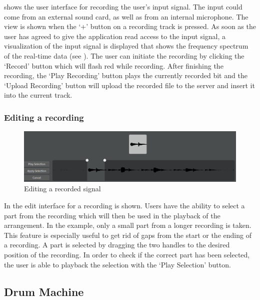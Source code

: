  shows the user interface for recording the user's input signal. The input could come from an external sound card, as well as from an internal microphone. The view is shown when the `+' button on a recording track is pressed. As soon as the user has agreed to give the application read access to the input signal, a visualization of the input signal is displayed that shows the frequency spectrum of the real-time data (see ). The user can initiate the recording by clicking the `Record' button which will flash red while recording. After finishing the recording, the `Play Recording' button plays the currently recorded bit and the `Upload Recording' button will upload the recorded file to the server and insert it into the current track.

\subsubsection{Editing a recording}
\label{subsub:recording-edit}

\begin{figure}[htb]
  \centerline{\includegraphics[width=\linewidth]{images/editing-a-recording.png}}
  \caption[Editing a recorded signal]{Editing a recorded signal}
  \label{fig:editor-editing-a-signal}
\end{figure}

In  the edit interface for a recording is shown. Users have the ability to select a part from the recording which will then be used in the playback of the arrangement. In the example, only a small part from a longer recording is taken. This feature is especially useful to get rid of gaps from the start or the ending of a recording. A part is selected by dragging the two handles to the desired position of the recording. In order to check if the correct part has been selected, the user is able to playback the selection with the `Play Selection' button.

\subsection{Drum Machine}
\label{concept-drum}

